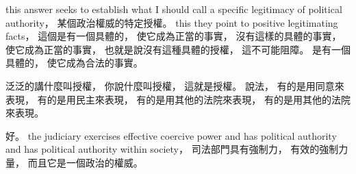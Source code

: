 \hypertarget{w02:cue:1161}{}this answer seeks to establish what I should call
\hypertarget{w02:cue:1162}{}a specific legitimacy of political authority，
\hypertarget{w02:cue:1163}{}某個政治權威的特定授權。
\hypertarget{w02:cue:1164}{}this they point to positive legitimating
\hypertarget{w02:cue:1165}{}facts，
\hypertarget{w02:cue:1166}{}這個是有一個具體的，
\hypertarget{w02:cue:1167}{}使它成為正當的事實，
\hypertarget{w02:cue:1168}{}沒有這樣的具體的事實，
\hypertarget{w02:cue:1169}{}使它成為正當的事實，
\hypertarget{w02:cue:1170}{}也就是說沒有這種具體的授權，
\hypertarget{w02:cue:1171}{}這不可能阻障。
\hypertarget{w02:cue:1172}{}是有一個具體的，
\hypertarget{w02:cue:1173}{}使它成為合法的事實。

\hypertarget{w02:cue:1174}{}泛泛的講什麼叫授權，
\hypertarget{w02:cue:1175}{}你說什麼叫授權，
\hypertarget{w02:cue:1176}{}這就是授權。
\hypertarget{w02:cue:1177}{}說法，
\hypertarget{w02:cue:1178}{}有的是用同意來表現，
\hypertarget{w02:cue:1179}{}有的是用民主來表現，
\hypertarget{w02:cue:1180}{}有的是用其他的法院來表現，
\hypertarget{w02:cue:1181}{}有的是用其他的法院來表現。

\hypertarget{w02:cue:1182}{}好。
\hypertarget{w02:cue:1183}{}the judiciary exercises effective coercive power
\hypertarget{w02:cue:1184}{}and has political authority
\hypertarget{w02:cue:1185}{}and has political authority
\hypertarget{w02:cue:1186}{}within society，
\hypertarget{w02:cue:1187}{}司法部門具有強制力，
\hypertarget{w02:cue:1188}{}有效的強制力量，
\hypertarget{w02:cue:1189}{}而且它是一個政治的權威。

